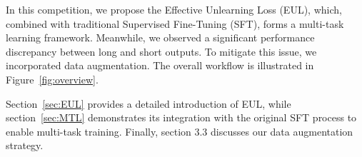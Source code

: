 \documentclass[11pt]{article}
\begin{document}

In this competition, we propose the Effective Unlearning Loss (EUL), which, combined with traditional Supervised Fine-Tuning (SFT), forms a multi-task learning framework. Meanwhile, we observed a significant performance discrepancy between long and short outputs. To mitigate this issue, we incorporated data augmentation. The overall workflow is illustrated in Figure~\ref{fig:overview}.

Section~\ref{sec:EUL} provides a detailed introduction of EUL, while section~\ref{sec:MTL} demonstrates its integration with the original SFT process to enable multi-task training. Finally, section 3.3 discusses our data augmentation strategy.



\end{document}
